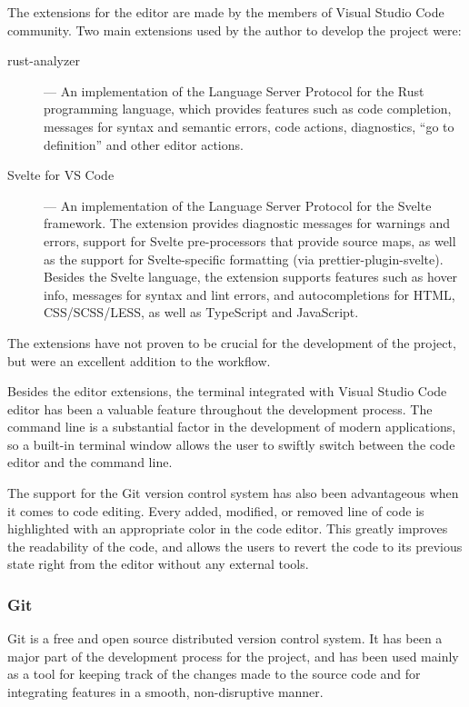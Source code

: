 \documentclass[english,bachelors,forcepolishlogotype]{wizthesis}
\begin{document}
The extensions for the editor are made by the members of Visual Studio Code
community. Two main extensions used by the author to develop the project were:
\begin{description}
  \item[rust-analyzer] \cite{rust-analyzer} --- An implementation of the
  Language Server Protocol for the Rust programming language, which provides
  features such as code completion, messages for syntax and semantic errors,
  code actions, diagnostics, ``go to definition'' and other editor actions.
  \item[Svelte for VS Code] \cite{svelte-for-vs-code} --- An implementation of
  the Language Server Protocol for the Svelte framework. The extension provides
  diagnostic messages for warnings and errors, support for Svelte pre-processors
  that provide source maps, as well as the support for Svelte-specific
  formatting (via prettier-plugin-svelte). Besides the Svelte language, the
  extension supports features such as hover info, messages for syntax and lint
  errors, and autocompletions for HTML, CSS/SCSS/LESS, as well as TypeScript and
  JavaScript.
\end{description}
The extensions have not proven to be crucial for the development of the project,
but were an excellent addition to the workflow.

Besides the editor extensions, the terminal integrated with Visual Studio Code
editor has been a valuable feature throughout the development process. The
command line is a substantial factor in the development of modern applications,
so a built-in terminal window allows the user to swiftly switch between the code
editor and the command line.

The support for the Git version control system has also been advantageous when
it comes to code editing. Every added, modified, or removed line of code is
highlighted with an appropriate color in the code editor. This greatly improves
the readability of the code, and allows the users to revert the code to its
previous state right from the editor without any external tools.

\subsubsection*{Git}

Git \cite{git} is a free and open source distributed version control system. It
has been a major part of the development process for the project, and has been
used mainly as a tool for keeping track of the changes made to the source code
and for integrating features in a smooth, non-disruptive manner.
\end{document}
